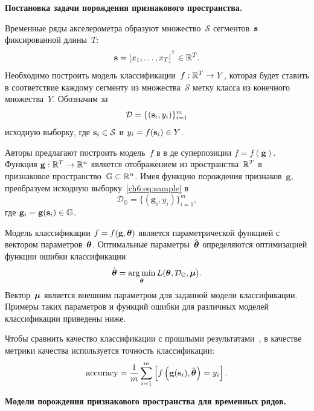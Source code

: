 \documentclass[11pt, a5paper]{dissert}
\begin{document}
\textbf{Постановка задачи порождения признакового пространства.}
\label{sec:ch6:feature_generation}

Временные ряды акселерометра образуют множество~$\mathcal{S}$ сегментов~$\mathbf{s}$ фиксированной длины~$T$:
\[
	\bs = [x_1, \dots, x_T]^{\T} \in \bbR^T.
\]
Необходимо построить модель классификации~$f: \mathbb{R}^T \rightarrow Y$, которая будет ставить в соответствие каждому сегменту из множества~$\mathcal{S}$ метку класса из конечного множества~$Y$.
Обозначим за
\begin{equation}
	\mathcal{D} = \{(\mathbf{s}_i, y_i)\}_{i=1}^m
	\label{ch6:eq:sample}
\end{equation}
исходную выборку, где $\mathbf{s}_i \in \mathcal{S}$ и $y_i = f(\mathbf{s}_i)\in Y$.

Авторы предлагают построить модель~$f$ в в де суперпозиции $f=f(\mathbf{g})$.
Функция $\mathbf{g}: \mathbb{R}^T \rightarrow \mathbb{R}^n$ является отображением из пространства~$\mathbb{R}^{T} $ в признаковое пространство~$\mathbb{G} \subset \mathbb{R}^n$.
Имея функцию порождения признаков~$\mathbf{g}$, преобразуем исходную выборку~\eqref{ch6:eq:sample} в
\[
	\mathcal{D}_\mathbb{G} = \{(\mathbf{g}_i, y_i)\}_{i=1}^m,
\]
где $\mathbf{g}_i = \mathbf{g}(\mathbf{s}_i) \in \mathbb{G}$. 

Модель классификации $f=f(\mathbf{g}, \boldsymbol{\theta})$ является параметрической функцией с вектором параметров~$\boldsymbol{\theta}$. 
Оптимальные параметры~$\hat{\boldsymbol{\theta}}$ определяются оптимизацией функции ошибки классификации
\begin{equation}
	\hat{\boldsymbol{\theta}} = \mathop{\arg \min}\limits_{\boldsymbol{\theta}} L(\boldsymbol{\theta}, \mathcal{D}_\mathbb{G}, \boldsymbol{\mu}).
	\label{ch6:eq:optimal_classification_params}
\end{equation}
Вектор~$\boldsymbol{\mu}$ является внешним параметром для заданной модели классификации. 
Примеры таких параметров и функций ошибки для различных моделей классификации приведены ниже.

Чтобы сравнить качество классификации с прошлыми результатами~\cite{karasikov2016feature,ivkin2015ts}, в качестве метрики качества используется точность классификации:
\begin{equation}
	\mathrm{accuracy} = \frac{1}{m} \sum_{i=1}^{m} \left[f\left(\mathbf{g}(\mathbf{s}_i), \hat{\boldsymbol{\theta}} \right)= y_i\right].
	\label{ch6:eq:accuracy}
\end{equation}

\textbf{Модели порождения признакового пространства для временных рядов.}
\label{sec:ch6:feature_generation_models}
\end{document}
